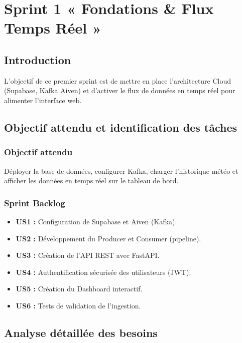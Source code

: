 \chapter{Sprint 1 « Fondations \& Flux Temps Réel »}

\section{Introduction}
L'objectif de ce premier sprint est de mettre en place l'architecture Cloud (Supabase, Kafka Aiven) et d'activer le flux de données en temps réel pour alimenter l'interface web.

\section{Objectif attendu et identification des tâches}

\subsection{Objectif attendu}
Déployer la base de données, configurer Kafka, charger l'historique météo et afficher les données en temps réel sur le tableau de bord.

\subsection{Sprint Backlog}
\begin{itemize}
    \item \textbf{US1 :} Configuration de Supabase et Aiven (Kafka).
    \item \textbf{US2 :} Développement du Producer et Consumer (pipeline).
    \item \textbf{US3 :} Création de l'API REST avec FastAPI.
    \item \textbf{US4 :} Authentification sécurisée des utilisateurs (JWT).
    \item \textbf{US5 :} Création du Dashboard interactif.
    \item \textbf{US6 :} Tests de validation de l'ingestion.
\end{itemize}

\section{Analyse détaillée des besoins}

